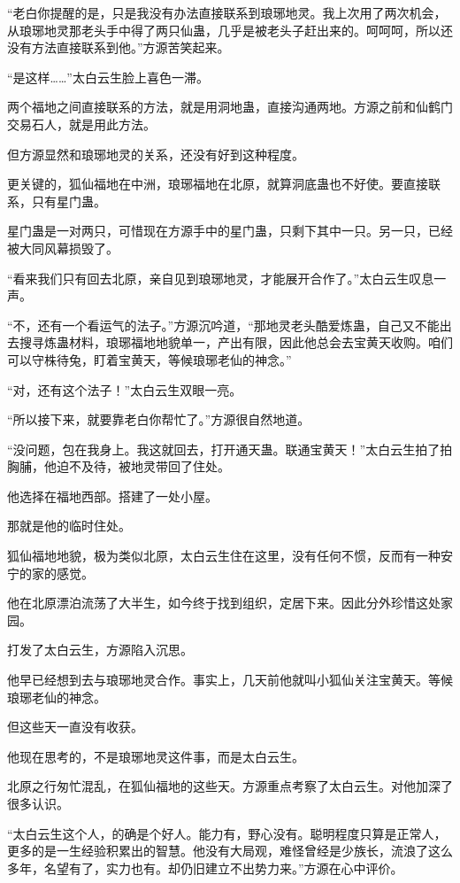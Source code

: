 
\begin{this_body}

“老白你提醒的是，只是我没有办法直接联系到琅琊地灵。我上次用了两次机会，从琅琊地灵那老头手中得了两只仙蛊，几乎是被老头子赶出来的。呵呵呵，所以还没有方法直接联系到他。”方源苦笑起来。

“是这样……”太白云生脸上喜色一滞。

两个福地之间直接联系的方法，就是用洞地蛊，直接沟通两地。方源之前和仙鹤门交易石人，就是用此方法。

但方源显然和琅琊地灵的关系，还没有好到这种程度。

更关键的，狐仙福地在中洲，琅琊福地在北原，就算洞底蛊也不好使。要直接联系，只有星门蛊。

星门蛊是一对两只，可惜现在方源手中的星门蛊，只剩下其中一只。另一只，已经被大同风幕损毁了。

“看来我们只有回去北原，亲自见到琅琊地灵，才能展开合作了。”太白云生叹息一声。

“不，还有一个看运气的法子。”方源沉吟道，“那地灵老头酷爱炼蛊，自己又不能出去搜寻炼蛊材料，琅琊福地地貌单一，产出有限，因此他总会去宝黄天收购。咱们可以守株待兔，盯着宝黄天，等候琅琊老仙的神念。”

“对，还有这个法子！”太白云生双眼一亮。

“所以接下来，就要靠老白你帮忙了。”方源很自然地道。

“没问题，包在我身上。我这就回去，打开通天蛊。联通宝黄天！”太白云生拍了拍胸脯，他迫不及待，被地灵带回了住处。

他选择在福地西部。搭建了一处小屋。

那就是他的临时住处。

狐仙福地地貌，极为类似北原，太白云生住在这里，没有任何不惯，反而有一种安宁的家的感觉。

他在北原漂泊流荡了大半生，如今终于找到组织，定居下来。因此分外珍惜这处家园。

打发了太白云生，方源陷入沉思。

他早已经想到去与琅琊地灵合作。事实上，几天前他就叫小狐仙关注宝黄天。等候琅琊老仙的神念。

但这些天一直没有收获。

他现在思考的，不是琅琊地灵这件事，而是太白云生。

北原之行匆忙混乱，在狐仙福地的这些天。方源重点考察了太白云生。对他加深了很多认识。

“太白云生这个人，的确是个好人。能力有，野心没有。聪明程度只算是正常人，更多的是一生经验积累出的智慧。他没有大局观，难怪曾经是少族长，流浪了这么多年，名望有了，实力也有。却仍旧建立不出势力来。”方源在心中评价。


\end{this_body}
